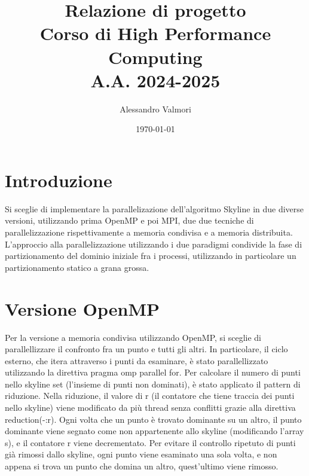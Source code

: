 \documentclass[letterpaper,11pt,leqno]{article}
\title{\vspace{-1cm} Relazione di progetto \\ Corso di High Performance Computing \\ A.A. 2024-2025}
\author{Alessandro Valmori}
\date{\vspace{-0.5cm} \today}  %
\begin{document}
\begingroup\let\newpage\relax\maketitle\endgroup  %

\vspace{-1cm}  %





\section{Introduzione}\label{s:introduction}
 
Si sceglie di implementare la parallelizazione dell'algoritmo Skyline in due diverse versioni, utilizzando prima OpenMP e poi MPI, due due tecniche di parallelizzazione rispettivamente a memoria condivisa e a memoria distribuita. L'approccio alla parallelizzazione utilizzando i due paradigmi condivide la fase di partizionamento del dominio iniziale fra i processi, utilizzando in particolare un partizionamento statico a grana grossa. 



\section{Versione OpenMP}\label{s:section}

Per la versione a memoria condivisa utilizzando OpenMP, si sceglie di parallellizzare il confronto fra un punto e tutti gli altri. In particolare, il ciclo esterno, che itera attraverso i punti da esaminare, è stato parallellizzato utilizzando la direttiva pragma omp parallel for. Per calcolare il numero di punti nello skyline set (l'insieme di punti non dominati), è stato applicato il pattern di riduzione. Nella riduzione, il valore di r (il contatore che tiene traccia dei punti nello skyline) viene modificato da più thread senza conflitti grazie alla direttiva reduction(-:r). Ogni volta che un punto è trovato dominante su un altro, il punto dominante viene segnato come non appartenente allo skyline (modificando l'array s), e il contatore r viene decrementato. Per evitare il controllo ripetuto di punti già rimossi dallo skyline, ogni punto viene esaminato una sola volta, e non appena si trova un punto che domina un altro, quest'ultimo viene rimosso.
\end{document}
